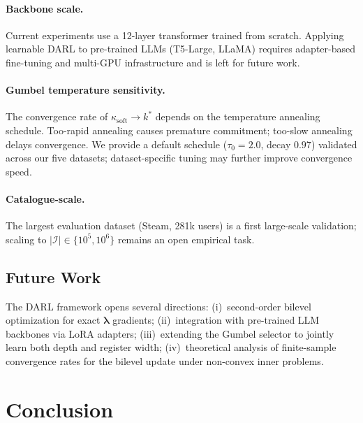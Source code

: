 \documentclass[lettersize,journal]{IEEEtran}
\newcommand{\lambdavec}{\boldsymbol{\lambda}}
\begin{document}
\paragraph*{Backbone scale.}
Current experiments use a 12-layer transformer trained from
scratch. Applying learnable DARL to pre-trained LLMs (T5-Large,
LLaMA) requires adapter-based fine-tuning and multi-GPU
infrastructure and is left for future work.

\paragraph*{Gumbel temperature sensitivity.}
The convergence rate of $\kappa_{\text{soft}} \to k^*$ depends
on the temperature annealing schedule.
Too-rapid annealing causes premature commitment; too-slow
annealing delays convergence.
We provide a default schedule ($\tau_0 = 2.0$, decay $0.97$)
validated across our five datasets; dataset-specific tuning
may further improve convergence speed.

\paragraph*{Catalogue-scale.}
The largest evaluation dataset (Steam, 281k users) is a first
large-scale validation; scaling to $|\mathcal{I}| \in \{10^5, 10^6\}$
remains an open empirical task.

\subsection{Future Work}

The DARL framework opens several directions:
(i)~second-order bilevel optimization for exact $\lambdavec$ gradients;
(ii)~integration with pre-trained LLM backbones via LoRA adapters;
(iii)~extending the Gumbel selector to jointly learn both depth
and register width;
(iv)~theoretical analysis of finite-sample convergence rates
for the bilevel update under non-convex inner problems.


\section{Conclusion}
\label{sec:conclusion}
\end{document}
